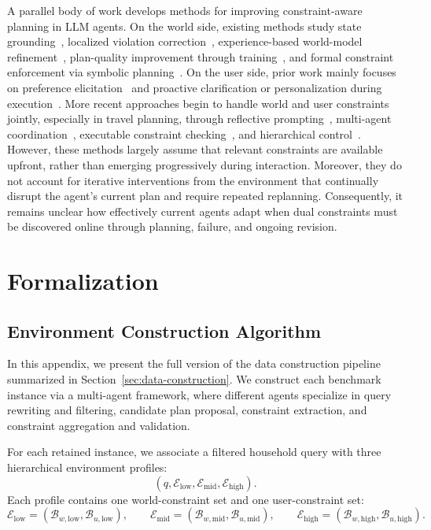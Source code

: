 \documentclass{llmxive}
\begin{document}
A parallel body of work develops methods for improving constraint-aware planning in LLM agents. 
On the world side, existing methods study state grounding~\citep{ReflAct}, localized violation correction~\citep{L-ICL}, experience-based world-model refinement~\citep{XENON}, plan-quality improvement through training~\citep{Plan-and-Act}, and formal constraint enforcement via symbolic planning~\citep{end-2-end-pddl}. 
On the user side, prior work mainly focuses on preference elicitation~\citep{userrl,TO-GATE} and proactive clarification or personalization during execution~\citep{Ask-before-Plan,sun2025trainingproactivepersonalizedllm,huang2025adactrl}. 
More recent approaches begin to handle world and user constraints jointly, especially in travel planning, through reflective prompting~\citep{MIRROR}, multi-agent coordination~\citep{ATLAS}, executable constraint checking~\citep{SCOPE}, and hierarchical control~\citep{HiMAP-Travel}. 
However, these methods largely assume that relevant constraints are available upfront, rather than emerging progressively during interaction. Moreover, they do not account for iterative interventions from the environment that continually disrupt the agent’s current plan and require repeated replanning. Consequently, it remains unclear how effectively current agents adapt when dual constraints must be discovered online through planning, failure, and ongoing revision.

\section{Formalization}
\label{app:formalization}

\subsection{Environment Construction Algorithm}
\label{app:env_cons_algorithm}

In this appendix, we present the full version of the data construction pipeline summarized in Section~\ref{sec:data-construction}. We construct each benchmark instance via a multi-agent framework, where different agents specialize in query rewriting and filtering, candidate plan proposal, constraint extraction, and constraint aggregation and validation.

For each retained instance, we associate a filtered household query with three hierarchical environment profiles:
\[
\left(
q,
\mathcal{E}_{\mathrm{low}},
\mathcal{E}_{\mathrm{mid}},
\mathcal{E}_{\mathrm{high}}
\right).
\]
Each profile contains one world-constraint set and one user-constraint set:
\[
\mathcal{E}_{\mathrm{low}}
=
\left(
\mathcal{B}_{w,\mathrm{low}},
\mathcal{B}_{u,\mathrm{low}}
\right),
\qquad
\mathcal{E}_{\mathrm{mid}}
=
\left(
\mathcal{B}_{w,\mathrm{mid}},
\mathcal{B}_{u,\mathrm{mid}}
\right),
\qquad
\mathcal{E}_{\mathrm{high}}
=
\left(
\mathcal{B}_{w,\mathrm{high}},
\mathcal{B}_{u,\mathrm{high}}
\right).
\]
\end{document}
